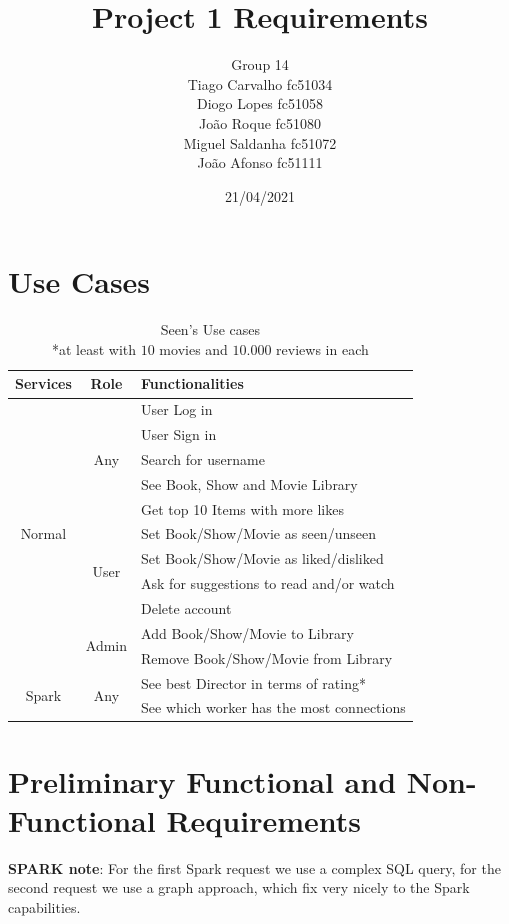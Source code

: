 \documentclass{article}
\title{Project 1 Requirements}
\author{Group 14 \\
Tiago Carvalho fc51034 \\
Diogo Lopes fc51058 \\
João Roque fc51080 \\
Miguel Saldanha fc51072 \\
João Afonso fc51111 \\
}
\date{21/04/2021}
\newcommand*\fpar{\hspace{1ex}}
\begin{document}
\maketitle

\section{Use Cases}
  \begin{table}[H]
    \centering
    \begin{tabular}{c|c|l} 
      Services & Role & Functionalities                 \\ \hline
      \multirow{11}{*}{ Normal }
        & \multirow{5}{*}{ Any } 
          & User Log in                                 \\
        & & User Sign in                                \\
        & & Search for username                         \\
        & & See Book, Show and Movie Library            \\ 
        & & Get top 10 Items with more likes            \\ \cline{2-3}
        & \multirow{4}{*}{ User } 
          & Set Book/Show/Movie as seen/unseen          \\
        & & Set Book/Show/Movie as liked/disliked       \\ 
        & & Ask for suggestions to read and/or watch    \\ 
        & & Delete account                              \\ \cline{2-3}
      & \multirow{2}{*}{ Admin } 
          & Add Book/Show/Movie to Library              \\
        & & Remove Book/Show/Movie from Library         \\ \hline
      \multirow{2}{*}{ Spark }
        & \multirow{2}{*}{ Any }
          & See best Director in terms of rating*       \\
        & & See which worker has the most connections   \\
    \end{tabular}
    \caption{Seen's Use cases                           \\
            \**at least with $10$ movies and $10.000$ reviews in each}
  \end{table}

\section{Preliminary Functional and Non-Functional Requirements}
\fpar \textbf{SPARK note}: For the first Spark request we use a complex SQL query, for the second request we use a graph approach, which fix very nicely to the Spark capabilities.
  
\end{document}
